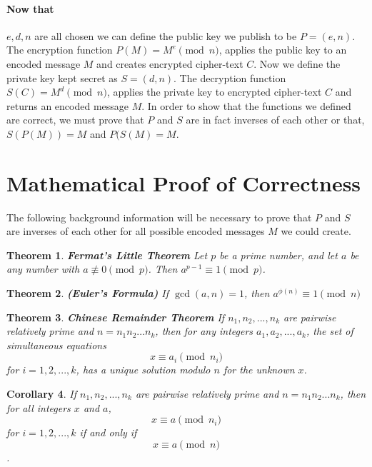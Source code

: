 \documentclass[12pt]{article}
\newtheorem{theorem}{Theorem}[section]
\newtheorem{corollary}[theorem]{Corollary}
\theoremstyle{remark}
\begin{document}
\paragraph{Now that} $e,d,n$ are all chosen we can define the public key we publish to be $P=(e,n)$.  The encryption function $P(M)= M^e \pmod{n}$, applies the public key to an encoded message $M$ and creates encrypted cipher-text $C$.  Now we define the private key kept secret as $S=(d,n)$.  The decryption function $S(C) = M^d \pmod{n}$, applies the private key to encrypted cipher-text $C$ and returns an encoded message $M$.  In order to show that the functions we defined are correct, we must prove that $P$ and $S$ are in fact inverses of each other or that, $S(P(M)) = M$ and $P(S(M) = M$. 

\section{Mathematical Proof of Correctness}

The following background information will be necessary to prove that $P$ and $S$ are inverses of each other for all possible encoded messages $M$ we could create.
\begin{theorem}
\label{fer_thm}
\emph{\textbf{Fermat's Little Theorem}} Let $p$ be a prime number, and let $a$ be any number with $a \not \equiv 0 \pmod{p}$.  Then $a^{p-1} \equiv 1 \pmod{p}$.
\end{theorem}

\begin{theorem}
\label{eul_thm}
\emph{\textbf{(Euler's Formula)}} If $\gcd(a, n) = 1$, then $a^{\phi(n)}\equiv 1 \pmod{n}$
\end{theorem}

\begin{theorem}
\label{chi_thm}
\emph{\textbf{Chinese Remainder Theorem}}  If $n_1,n_2,...,n_k$ are pairwise relatively prime and $n=n_1n_2...n_k$, then for any integers $a_1,a_2,...,a_k$, the set of simultaneous equations
\[x\equiv a_i \pmod{n_i}\]
for $i=1,2,...,k$, has a unique solution modulo $n$ for the unknown $x$.
\end{theorem}

\begin{corollary}
\label{chi_thm2}
If $n_1,n_2,...,n_k$ are pairwise relatively prime and $n=n_1n_2...n_k$, then for all integers $x$ and $a$,
\[x \equiv a \pmod{n_i}\]
for $i=1,2,...,k$ if and only if
\[x \equiv a \pmod{n} \].
\end{corollary}
\end{document}
